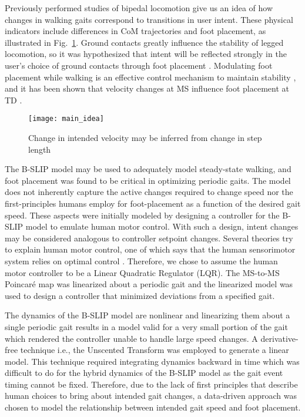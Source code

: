Previously performed studies of bipedal locomotion give us an idea of how changes in walking gaits correspond to transitions in user intent. These physical indicators include differences in CoM trajectories and foot placement, as illustrated in Fig.~\ref{fig:main_idea}. Ground contacts greatly influence the stability of legged locomotion, so it was hypothesized that intent will be reflected strongly in the user's choice of ground contacts through foot placement \cite{bhounsule2014foot}. Modulating foot placement while walking is an effective control mechanism to maintain stability \cite{hof2010balance,bhounsule2015control}, and it has been shown that velocity changes at MS influence foot placement at TD \cite{wang2014stepping,redfern1994model}. 

\begin{figure}
	\centering
	\texttt{[image: main\_idea]}
	\caption{Change in intended velocity may be inferred from change in step length}\label{fig:main_idea}
\end{figure}

The B-SLIP model may be used to adequately model steady-state walking, and foot placement was found to be critical in optimizing periodic gaits. The model does not inherently capture the active changes required to change speed nor the first-principles humans employ for foot-placement as a function of the desired gait speed. These aspects were initially modeled by designing a controller for the B-SLIP model to emulate human motor control. With such a design, intent changes may be considered analogous to controller setpoint changes. Several theories try to explain human motor control, one of which says that the human sensorimotor system relies on optimal control \cite{todorov2004optimality,sylla2014assessing}. Therefore, we chose to assume the human motor controller to be a Linear Quadratic Regulator (LQR). The MS-to-MS Poincar\'e map was linearized about a periodic gait and the linearized model was used to design a controller that minimized deviations from a specified gait. 

The dynamics of the B-SLIP model are nonlinear and linearizing them about a single periodic gait results in a model valid for a very small portion of the gait which rendered the controller unable to handle large speed changes. A derivative-free technique i.e., the Unscented Transform \cite{manchester2016derivative} was employed to generate a linear model. This technique required integrating dynamics backward in time which was difficult to do for the hybrid dynamics of the B-SLIP model as the gait event timing cannot be fixed. Therefore, due to the lack of first principles that describe human choices to bring about intended gait changes, a data-driven approach was chosen to model the relationship between intended gait speed and foot placement.

